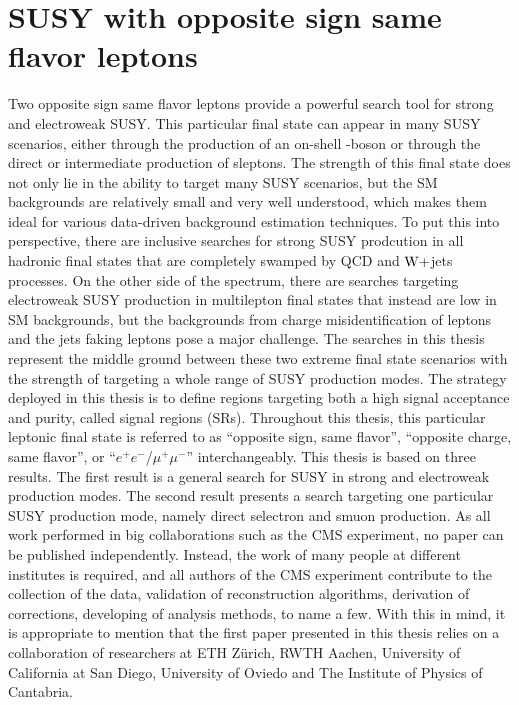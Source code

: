 \section{SUSY with opposite sign same flavor leptons}\label{sec:susyOS2l}
\noindent\justify
Two opposite sign same flavor leptons provide a powerful search tool for strong and electroweak SUSY. 
This particular final state can appear in many SUSY scenarios, either through the production of an on-shell \PZ-boson or through the direct or intermediate production of sleptons. 
The strength of this final state does not only lie in the ability to target many SUSY scenarios, but the SM backgrounds are relatively small and very well understood, which makes them ideal for various data-driven background estimation techniques. 
To put this into perspective, there are inclusive searches for strong SUSY prodcution in all hadronic final states that are completely swamped by QCD and $\mathrm{W}+$jets processes. 
On the other side of the spectrum, there are searches targeting electroweak SUSY production in multilepton final states that instead are low in SM backgrounds, but the backgrounds from charge misidentification of leptons and the jets faking leptons pose a major challenge. 
The searches in this thesis represent the middle ground between these two extreme final state scenarios with the strength of targeting a whole range of SUSY production modes.   
The strategy deployed in this thesis is to define regions targeting both a high signal acceptance and purity, called signal regions (SRs).
Throughout this thesis, this particular leptonic final state is referred to as ``opposite sign, same flavor'', ``opposite charge, same flavor'', or ``$e^{+}e^{-}$/$\mu^{+}\mu^{-}$'' interchangeably. 
\newpara
\noindent\justify
This thesis is based on three results. 
The first result \cite{Sirunyan:2017qaj} is a general search for SUSY in strong and electroweak production modes. 
The second result \cite{Sirunyan:2018nwe} presents a search targeting one particular SUSY production mode, namely direct selectron and smuon production.  
As all work performed in big collaborations such as the CMS experiment, no paper can be published independently. 
Instead, the work of many people at different institutes is required, and all authors of the CMS experiment contribute to the collection of the data, validation of reconstruction algorithms, derivation of corrections, developing of analysis methods, to name a few. 
With this in mind, it is appropriate to mention that the first paper presented in this thesis relies on a collaboration of researchers at ETH Z\"{u}rich, RWTH Aachen, University of California at San Diego, University of Oviedo and The Institute of Physics of Cantabria. 
